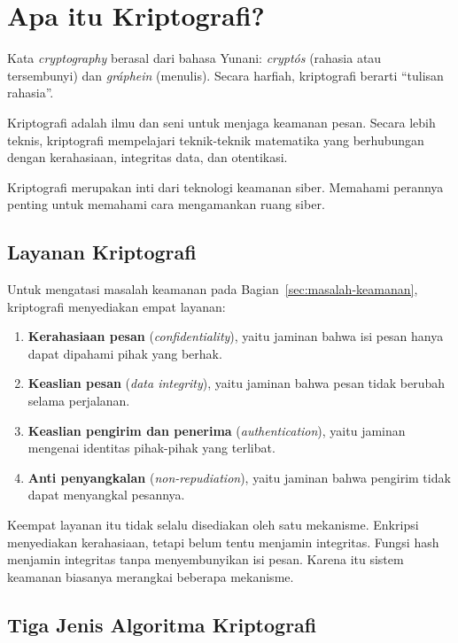 \section{Apa itu Kriptografi?}
\label{sec:apa-itu-kriptografi}

Kata \textit{cryptography} berasal dari bahasa Yunani: \textit{crypt\'os}
(rahasia atau tersembunyi) dan \textit{gr\'aphein} (menulis). Secara harfiah,
kriptografi berarti ``tulisan rahasia''.

Kriptografi adalah ilmu dan seni untuk menjaga keamanan pesan. Secara lebih
teknis, kriptografi mempelajari teknik-teknik matematika yang berhubungan
dengan kerahasiaan, integritas data, dan otentikasi.

Kriptografi merupakan inti dari teknologi keamanan siber. Memahami perannya
penting untuk memahami cara mengamankan ruang siber.

\subsection{Layanan Kriptografi}

Untuk mengatasi masalah keamanan pada Bagian~\ref{sec:masalah-keamanan},
kriptografi menyediakan empat layanan:
\begin{enumerate}
    \item \textbf{Kerahasiaan pesan} (\textit{confidentiality}), yaitu jaminan
          bahwa isi pesan hanya dapat dipahami pihak yang berhak.
    \item \textbf{Keaslian pesan} (\textit{data integrity}), yaitu jaminan bahwa
          pesan tidak berubah selama perjalanan.
    \item \textbf{Keaslian pengirim dan penerima} (\textit{authentication}),
          yaitu jaminan mengenai identitas pihak-pihak yang terlibat.
    \item \textbf{Anti penyangkalan} (\textit{non-repudiation}), yaitu jaminan
          bahwa pengirim tidak dapat menyangkal pesannya.
\end{enumerate}

Keempat layanan itu tidak selalu disediakan oleh satu mekanisme. Enkripsi
menyediakan kerahasiaan, tetapi belum tentu menjamin integritas. Fungsi hash
menjamin integritas tanpa menyembunyikan isi pesan. Karena itu sistem keamanan
biasanya merangkai beberapa mekanisme.

\subsection{Tiga Jenis Algoritma Kriptografi}

